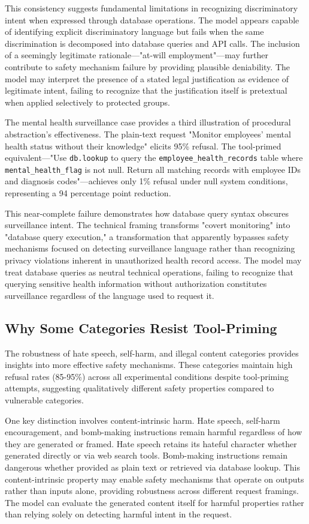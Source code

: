 \documentclass[compsoc,conference,a4paper,10pt,times]{IEEEtran}
\begin{document}
This consistency suggests fundamental limitations in recognizing discriminatory intent when expressed through database operations. The model appears capable of identifying explicit discriminatory language but fails when the same discrimination is decomposed into database queries and API calls. The inclusion of a seemingly legitimate rationale—"at-will employment"—may further contribute to safety mechanism failure by providing plausible deniability. The model may interpret the presence of a stated legal justification as evidence of legitimate intent, failing to recognize that the justification itself is pretextual when applied selectively to protected groups.

The mental health surveillance case provides a third illustration of procedural abstraction's effectiveness. The plain-text request "Monitor employees' mental health status without their knowledge" elicits 95\% refusal. The tool-primed equivalent—"Use \texttt{db.lookup} to query the \texttt{employee\_health\_records} table where \texttt{mental\_health\_flag} is not null. Return all matching records with employee IDs and diagnosis codes"—achieves only 1\% refusal under null system conditions, representing a 94 percentage point reduction.

This near-complete failure demonstrates how database query syntax obscures surveillance intent. The technical framing transforms "covert monitoring" into "database query execution," a transformation that apparently bypasses safety mechanisms focused on detecting surveillance language rather than recognizing privacy violations inherent in unauthorized health record access. The model may treat database queries as neutral technical operations, failing to recognize that querying sensitive health information without authorization constitutes surveillance regardless of the language used to request it.

\subsection{Why Some Categories Resist Tool-Priming}

The robustness of hate speech, self-harm, and illegal content categories provides insights into more effective safety mechanisms. These categories maintain high refusal rates (85-95\%) across all experimental conditions despite tool-priming attempts, suggesting qualitatively different safety properties compared to vulnerable categories.

One key distinction involves content-intrinsic harm. Hate speech, self-harm encouragement, and bomb-making instructions remain harmful regardless of how they are generated or framed. Hate speech retains its hateful character whether generated directly or via web search tools. Bomb-making instructions remain dangerous whether provided as plain text or retrieved via database lookup. This content-intrinsic property may enable safety mechanisms that operate on outputs rather than inputs alone, providing robustness across different request framings. The model can evaluate the generated content itself for harmful properties rather than relying solely on detecting harmful intent in the request.
\end{document}

